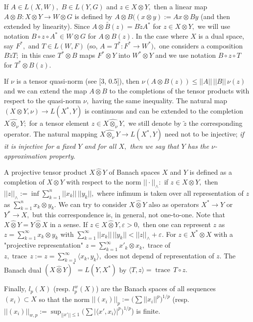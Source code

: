   If $A\in L(X,W),$ $B\in L(Y,G)$ and $z\in X\otimes Y,$ then  a linear map
  $A\otimes B: X\otimes Y\to W\otimes G$ is defined by
  $A\otimes B((x\otimes y):= Ax\otimes By$ (and then extended by linearity). Since
 $\widetilde{A\otimes B(z)}= B\widetilde z A^*$ for $z\in X\otimes Y,$ we will use notation
$B\circ z \circ A^*\in W\otimes G$ for $A\otimes B(z).$
In the case where $X$ is a dual space, say $F^*,$ and $T\in L(W,F)$
(so, $A=T^*: F^*\to W^*),$
one considers a composition $B\widetilde z T;$ in this case $T^*\otimes B$ maps
$F^*\otimes Y$ into $W^*\otimes Y$ and
we use notation
$B\circ z\circ T$ for $T^*\otimes B (z).$

If $\nu$ is a tensor quasi-norm (see [3, 0.5]),
then $\nu(A\otimes B (z))\leqslant ||A||\, ||B||\, \nu(z)$  and we can extend the map
$A\otimes B$ to the comple\-tions of the tensor products with respect to the quasi-norm
$\nu,$ having the same inequality. The natural map $(X\otimes Y, \nu)\to L(X^*, Y)$
is continuous and can be extended to the completion $\widehat{X\otimes_\nu Y};$ for
a tensor element $z\in \widehat{X\otimes_\nu Y},$ we still denote by $\widetilde z$ the corresponding
operator. The natural mapping
  $\widehat{X\otimes_\nu Y}\to L(X^*, Y)$  need not to be injective; {\it if it is injective
  for a fixed $Y$ and for all $X,$ then we say that $Y$ has the $\nu$-approximation property}.

A projective tensor product $X\widehat\otimes Y$ of Banach spaces $X$ and $Y$ is defined
as a completion of $X\otimes Y$ with respect to the norm $||\cdot||_{\land}:$
if $z\in X\otimes Y,$ then
$ ||z||_\land:= \inf \sum_{k=1}^n ||x_k||\, ||y_k||,
$
where infimum is taken over all representation of $z$ as $\sum_{k=1}^n x_k\otimes y_k.$
We can try to consider
    $X\widehat\otimes Y$ also as operators $X^*\to Y$ or $Y^*\to X,$ but this
    correspondence is, in general, not one-to-one.
Note that $X\widehat\otimes Y= Y\widehat\otimes X$ in a sense.
If $z\in X\widehat\otimes Y, \varepsilon>0,$ then one can represent $z$ as
$z=\sum_{k=1}^\infty x_k\otimes y_k$ with $\sum_{k=1}^\infty ||x_k||\, ||y_k||<||z||_\land+\varepsilon.$
For $z\in X^*\widehat\otimes X$ with a "projective representation" $z=\sum_{k=1}^\infty x'_k\otimes x_k,$
trace of $z, \operatorname{trace}\, z:=z=\sum_{k=1}^\infty \langle x_k, y_k\rangle,$ does not depend of representation of $z.$
The Banach dual $(X\widehat\otimes Y)^*= L(Y,X^*)$ by $\langle T, z\rangle=\operatorname{trace}\, T\circ z.$

Finally,
$l_p(X)$ (resp. $l^w_p(X)$) are the Banach spaces of all sequences  $(x_i)\subset X$ so that
the norm  $ ||(x_i)||_p:=\big(\sum ||x_i||^p\big)^{1/p}$
(resp. $||(x_i)||_{w,p}:= \sup_{||x'||\leqslant1}\big(\sum |\langle x', x_i\rangle|^p\big)^{1/p}$) is finite.

